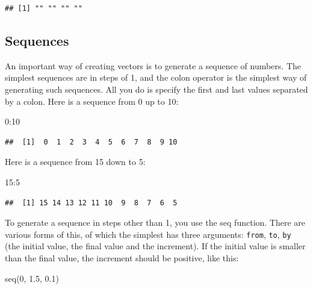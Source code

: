\documentclass[
]{book}
\newenvironment{Shaded}{\begin{snugshade}}{\end{snugshade}}
\newcommand{\DecValTok}[1]{\textcolor[rgb]{0.00,0.00,0.81}{#1}}
\newcommand{\FloatTok}[1]{\textcolor[rgb]{0.00,0.00,0.81}{#1}}
\newcommand{\FunctionTok}[1]{\textcolor[rgb]{0.00,0.00,0.00}{#1}}
\newcommand{\NormalTok}[1]{#1}
\newcommand{\SpecialCharTok}[1]{\textcolor[rgb]{0.00,0.00,0.00}{#1}}
\begin{document}
\begin{verbatim}
## [1] "" "" "" ""
\end{verbatim}

\hypertarget{sequences}{%
\subsection{Sequences}\label{sequences}}

An important way of creating vectors is to generate a sequence of numbers. The simplest sequences are in steps of 1, and the colon operator is the simplest way of generating such sequences. All you do is specify the first and last values separated by a colon. Here is a sequence from 0 up to 10:

\begin{Shaded}
\begin{Highlighting}[]
\DecValTok{0}\SpecialCharTok{:}\DecValTok{10}
\end{Highlighting}
\end{Shaded}

\begin{verbatim}
##  [1]  0  1  2  3  4  5  6  7  8  9 10
\end{verbatim}

Here is a sequence from 15 down to 5:

\begin{Shaded}
\begin{Highlighting}[]
\DecValTok{15}\SpecialCharTok{:}\DecValTok{5}
\end{Highlighting}
\end{Shaded}

\begin{verbatim}
##  [1] 15 14 13 12 11 10  9  8  7  6  5
\end{verbatim}

To generate a sequence in steps other than 1, you use the seq function. There are various forms of this, of which the simplest has three arguments: \texttt{from}, \texttt{to}, \texttt{by} (the initial value, the final value and the increment). If the initial value is smaller than the final value, the increment should be positive, like this:

\begin{Shaded}
\begin{Highlighting}[]
\FunctionTok{seq}\NormalTok{(}\DecValTok{0}\NormalTok{, }\FloatTok{1.5}\NormalTok{, }\FloatTok{0.1}\NormalTok{)}
\end{Highlighting}
\end{Shaded}
\end{document}
